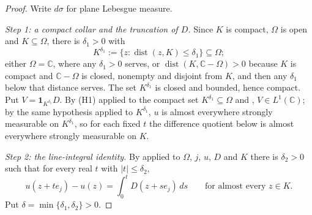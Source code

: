 \begin{proof}
Write $d\sigma$ for plane Lebesgue measure.

\emph{Step 1: a compact collar and the truncation of $D$.}  Since $K$ is
compact, $\Omega$ is open and $K\subseteq\Omega$, there is $\delta_1>0$ with
\[
  K^{\delta_1}:=\{z:\operatorname{dist}(z,K)\le\delta_1\}\subseteq\Omega ;
\]
either $\Omega=\mathbb{C}$, where any $\delta_1>0$ serves, or
$\operatorname{dist}(K,\mathbb{C}-\Omega)>0$ because $K$ is compact and
$\mathbb{C}-\Omega$ is closed, nonempty and disjoint from $K$, and then any
$\delta_1$ below that distance serves.  The set $K^{\delta_1}$ is closed and
bounded, hence compact.  Put $V=\mathbf{1}_{K^{\delta_1}}D$.  By (H1) applied
to the compact set $K^{\delta_1}\subseteq\Omega$ and ,
$V\in L^{1}(\mathbb{C})$; by the same hypothesis applied to $K^{\delta_1}$,
$u$ is almost everywhere strongly measurable on $K^{\delta_1}$, so for each
fixed $t$ the difference quotient below is almost everywhere strongly
measurable on $K$.

\emph{Step 2: the line-integral identity.}  By 
applied to $\Omega$, $j$, $u$, $D$ and $K$ there is $\delta_2>0$ such that for
every real $t$ with $|t|\le\delta_2$,
\begin{equation}\tag{1}
  u(z+te_j)-u(z)=\int_0^tD(z+se_j)\,ds
  \qquad\text{for almost every }z\in K .
\end{equation}
Put $\delta=\min\{\delta_1,\delta_2\}>0$.


\end{proof}
